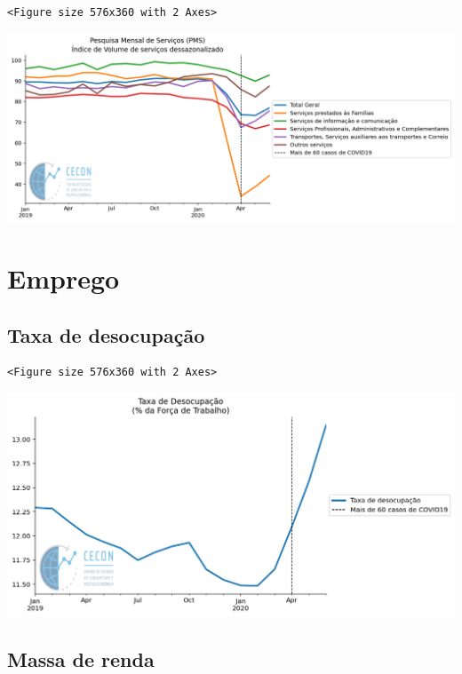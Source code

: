 \documentclass[11pt]{article}
\begin{document}
\begin{verbatim}
<Figure size 576x360 with 2 Axes>
\end{verbatim}


\begin{center}
\includegraphics[width=.9\linewidth]{obipy-resources/62e383af79e91b63c7fc98dd7fb55b3c3ececcb9/181f90829a4ff703f104c216bbca7ddef8caedba.png}
\end{center}

\section{Emprego}
\label{sec:orgb5f038b}



\subsection{Taxa de desocupação}
\label{sec:orgc46c82e}

\begin{verbatim}
<Figure size 576x360 with 2 Axes>
\end{verbatim}


\begin{center}
\includegraphics[width=.9\linewidth]{obipy-resources/62e383af79e91b63c7fc98dd7fb55b3c3ececcb9/05b5bbdb5ce773aac14916a26efe4f5099ed256d.png}
\end{center}


\subsection{Massa de renda}
\label{sec:org22b0019}
\end{document}
